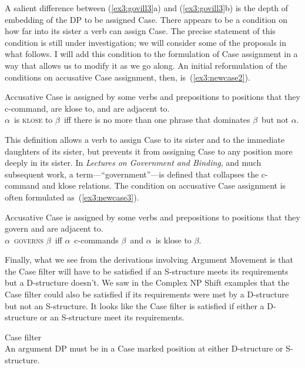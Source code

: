 A salient difference between (\ref{ex3:govill3}a) and (\ref{ex3:govill3}b) is the depth of embedding of the DP to be assigned Case. There appears to be a condition on how far into its sister a verb can assign Case. The precise statement of this condition is still under investigation; we will consider some of the proposals in what follows. I will add this condition to the formulation of Case assignment in a way that allows us to modify it as we go along. An initial reformulation of the conditions on accusative Case assignment, then, is~(\ref{ex3:newcase2}).
\begin{exe}
\ex \label{ex3:newcase2} Accusative Case is assigned by some verbs and prepositions to positions that they c-command, are klose to, and are adjacent to.\\[7pt]
$\alpha$\ is \textsc{klose} to $\beta$\ iff there is no more than one phrase that dominates $\beta$\ but not $\alpha$.
\end{exe}
This definition allows a verb to assign Case to its sister and to the immediate daughters of its sister, but prevents it from assigning Case to any position more deeply in its sister. In \emph{Lectures on Government and Binding}, and much subsequent work, a term---``government''---is defined that collapses the \mbox{c-command} and klose relations. The condition on accusative Case assignment is often formulated as~(\ref{ex3:newcase3}).
\begin{exe}
\ex \label{ex3:newcase3} Accusative Case is assigned by some verbs and prepositions to positions that they govern and are adjacent to.\\[7pt]
$\alpha$\ \textsc{governs} $\beta$\ iff $\alpha$\ c-commands $\beta$\ and $\alpha$\ is klose to $\beta$.
\end{exe}

Finally, what we see from the derivations involving Argument Movement is that the Case filter will have to be satisfied if an S-structure meets its requirements but a D-structure doesn't. We saw in the Complex NP Shift examples that the Case filter could also be satisfied if its requirements were met by a D-structure but not an S-structure. It looks like the Case filter is satisfied if either a D-structure or an S-structure meet its requirements.
\begin{exe}
	\raggedright
	\ex \label{ex3:csf} Case filter\\
	An argument DP must be in a Case marked position at either D-structure or S-structure.
\end{exe}

